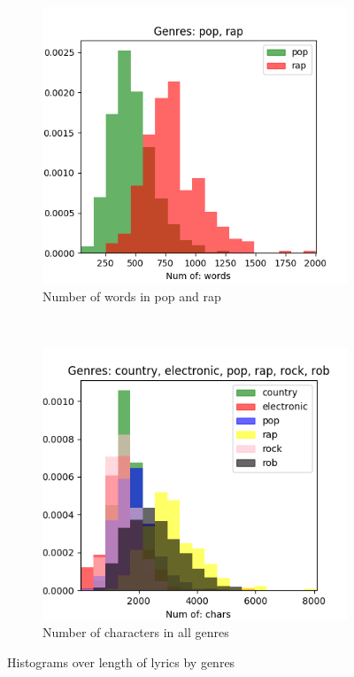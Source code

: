 \documentclass[a4paper, 12pt]{article}
\begin{document}
\begin{figure}[H]
    \centering
    \begin{subfigure}[b]{0.48\textwidth}
        \includegraphics[width=\textwidth]{res/words-pop_rap.png}
        \caption{Number of words in pop and rap}
    \end{subfigure}
    ~ %
    \begin{subfigure}[b]{0.48\textwidth}
        \includegraphics[width=\textwidth]{res/chars-country_electronic_pop_rap_rock_rob.png}
        \caption{Number of characters in all genres}
    \end{subfigure}
    \caption{Histograms over length of lyrics by genres}
    \label{fig:words}
\end{figure}
\end{document}
